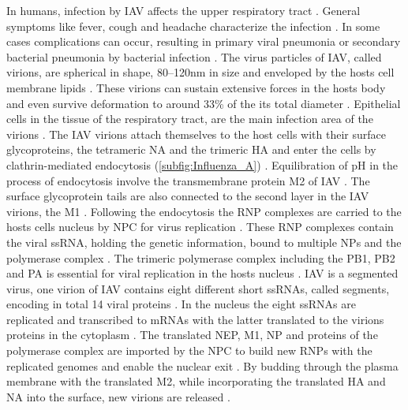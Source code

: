 In humans, infection by \gls{IAV} affects the upper respiratory tract \autocite{julkunen_inflammatory_2000}. General symptoms like fever, cough and headache characterize the infection \autocite{julkunen_inflammatory_2000}. In some cases complications can occur, resulting in primary viral pneumonia or secondary bacterial pneumonia by bacterial infection \autocite{julkunen_inflammatory_2000}. The virus particles of \gls{IAV}, called virions, are spherical in shape, 80–120nm in size and enveloped by the hosts cell membrane lipids \autocite{oxford_chapter_1987, mudhakir_learning_2009, cann_chapter_2016}. These virions can sustain extensive forces in the hosts body and even survive deformation to around 33\% of the its total diameter \autocite{schaap_effect_2012}. Epithelial cells in the tissue of the respiratory tract, are the main infection area of the virions \autocite{oxford_chapter_1987}. The \gls{IAV} virions attach themselves to the host cells with their surface glycoproteins, the tetrameric \gls{NA} and the trimeric \gls{HA} and enter the cells by clathrin-mediated endocytosis (\autoref{subfig:Influenza_A}) \autocite{wilson_structure_1981, varghese_structure_1983, jones_global_2008, mudhakir_learning_2009}. Equilibration of pH in the process of endocytosis involve the transmembrane protein \gls{M2} of \gls{IAV} \autocite{pielak_influenza_2011}. The surface glycoprotein tails are also connected to the second layer in the \gls{IAV} virions, the \gls{M1} \autocite{ali_influenza_2000}. Following the endocytosis the \gls{RNP} complexes are carried to the hosts cells nucleus by \gls{NPC} for virus replication \autocite{eisfeld_at_2015}. These \gls{RNP} complexes contain the viral \gls{ssRNA}, holding the genetic information, bound to multiple \glspl{NP} and the polymerase complex \autocite{eisfeld_at_2015}. The trimeric polymerase complex including the \gls{PB1}, \gls{PB2} and \gls{PA} is essential for viral replication in the hosts nucleus \autocite{area_3d_2004, eisfeld_at_2015}. \gls{IAV} is a segmented virus, one virion of \gls{IAV} contains eight different short \glspl{ssRNA}, called segments, encoding in total 14 viral proteins \autocite{eisfeld_at_2015}. In the nucleus the eight \glspl{ssRNA} are replicated and transcribed to \glspl{mRNA} with the latter translated to the virions proteins in the cytoplasm \autocite{eisfeld_at_2015}. The translated \gls{NEP}, \gls{M1}, \gls{NP} and proteins of the polymerase complex are imported by the \gls{NPC} to build new \glspl{RNP} with the replicated genomes and enable the nuclear exit \autocite{eisfeld_at_2015}. By budding through the plasma membrane with the translated \gls{M2}, while incorporating the translated \gls{HA} and \gls{NA} into the surface, new virions are released \autocite{eisfeld_at_2015}.

